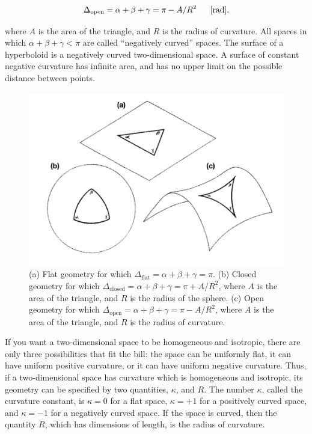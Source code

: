 \documentclass[a4paper,11pt]{article}
\begin{document}
\begin{align*}
    \Delta_\mathrm{open} = \alpha + \beta + \gamma = \pi - A/R^2 ~~~~~[{\rm rad}],
\end{align*}

{\noindent}where $A$ is the area of the triangle, and $R$ is the radius of curvature. All spaces in which $\alpha + \beta + \gamma < \pi$ are called ``negatively curved'' spaces. The surface of a hyperboloid is a negatively curved two-dimensional space. A surface of constant negative curvature has infinite area, and has no upper limit on the possible distance between points.

\begin{figure}[h]
    \includegraphics[width=14cm]{figures/geometries.png}
    \centering
    \caption{(a) Flat geometry for which $ \Delta_\mathrm{flat} = \alpha + \beta + \gamma = \pi$. (b) Closed geometry for which $\Delta_\mathrm{closed} = \alpha + \beta + \gamma = \pi + A/R^2$, where $A$ is the area of the triangle, and $R$ is the radius of the sphere. (c) Open geometry for which $\Delta_\mathrm{open} = \alpha + \beta + \gamma = \pi - A/R^2$, where $A$ is the area of the triangle, and $R$ is the radius of curvature.}
    \label{fig:geometries}
\end{figure}

{\noindent}If you want a two-dimensional space to be homogeneous and isotropic, there are only three possibilities that fit the bill: the space can be uniformly flat, it can have uniform positive curvature, or it can have uniform negative curvature. Thus, if a two-dimensional space has curvature which is homogeneous and isotropic, its geometry can be specified by two quantities, $\kappa$, and $R$. The number $\kappa$, called the curvature constant, is $\kappa = 0$ for a flat space, $\kappa = +1$ for a positively curved space, and $\kappa = −1$ for a negatively curved space. If the space is curved, then the quantity $R$, which has dimensions of length, is the radius of curvature.
\end{document}
